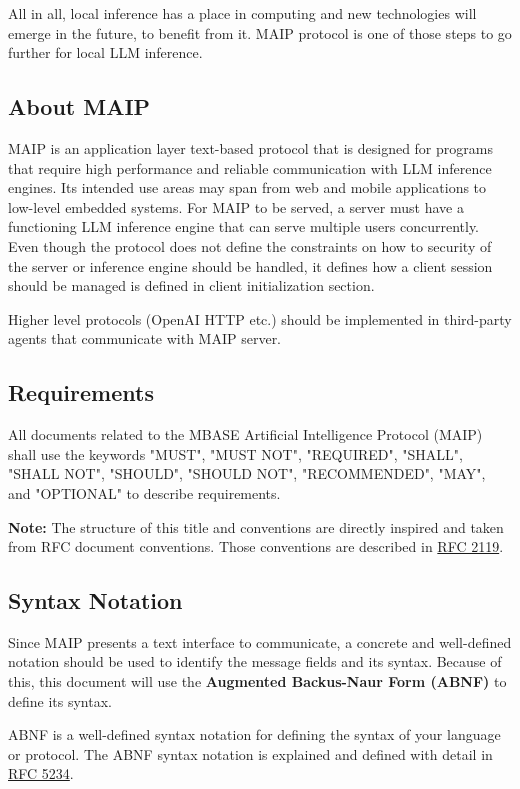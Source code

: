 \documentclass{article}
\begin{document}
All in all, local inference has a place in computing and new technologies will emerge in the future, to benefit from it. MAIP protocol is one of those steps to go further for local LLM inference.

\subsection{About MAIP}
MAIP is an application layer text-based protocol that is designed for programs that require high performance and reliable communication with LLM inference engines. Its intended use areas may span from web and mobile applications to low-level embedded systems. For MAIP to be served, a server must have a functioning LLM inference engine that can serve multiple users concurrently.
Even though the protocol does not define the constraints on how to security of the server or inference engine should be handled, it defines how a client session should be managed is defined in client initialization section.\newline

Higher level protocols (OpenAI HTTP etc.) should be implemented in third-party agents that communicate with MAIP server.
\subsection{Requirements}
All documents related to the MBASE Artificial Intelligence Protocol (MAIP) shall use the keywords "MUST", "MUST NOT", "REQUIRED", "SHALL", "SHALL NOT", "SHOULD", "SHOULD NOT", "RECOMMENDED", "MAY", and "OPTIONAL" to describe requirements.\newline

\textbf{Note: }
The structure of this title and conventions are directly inspired and taken from RFC document conventions. Those conventions are described in \underline{RFC 2119}.

\subsection{Syntax Notation}
Since MAIP presents a text interface to communicate, a concrete and well-defined notation should be used to identify the message fields and its syntax. Because of this, this document will use the \textbf{Augmented Backus-Naur Form (ABNF)} to define its syntax.\newline

ABNF is a well-defined syntax notation for defining the syntax of your language or protocol. The ABNF syntax notation is explained and defined with detail in \underline{RFC 5234}. \newline
\end{document}
